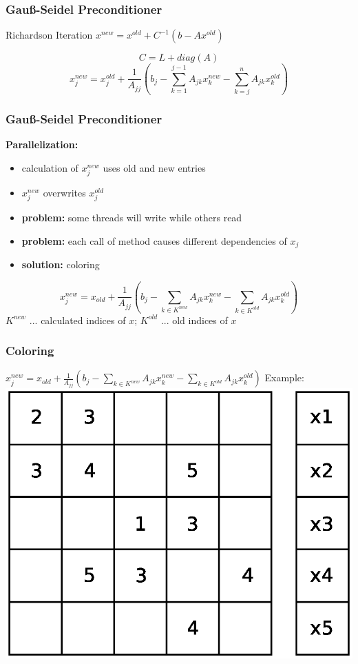 \documentclass{beamer}
\begin{document}
\begin{frame}
\frametitle{Gau\ss-Seidel Preconditioner}
\begin{block}{Richardson Iteration}
$x^{new} = x^{old} + C^{-1} (b - Ax^{old})$
\end{block}
$$C = L + diag(A)$$
$$x_j^{new} = x_j^{old} + \frac{1}{A_{jj}} \left(b_{j} - \sum_{k=1}^{j-1} A_{jk}
x_k^{new} - \sum_{k=j}^{n} A_{jk} x_k^{old}\right)$$

\end{frame}

\begin{frame}
\frametitle{Gau\ss-Seidel Preconditioner}

\textbf{Parallelization:}
\begin{itemize}
\item calculation of $x_j^{new}$ uses old and new entries
\item $x_j^{new}$ overwrites $x_j^{old}$
\item \textbf{problem:} some threads will write while others read
\item \textbf{problem:} each call of method causes different dependencies of $x_j$ 
\item \textbf{solution:}
coloring
\end{itemize}


$$ x_j^{new} = x_{old} + \frac{1}{A_{jj}} \left(b_{j} - \sum_{k \in K^{new}}A_{jk}
 x_k^{new} - \sum_{k \in K^{old}}A_{jk} x_k^{old}\right)$$
$K^{new}$ ... calculated indices of $x$;
$K^{old}$ ... old indices of $x$
\end{frame}

\begin{frame}
\frametitle{Coloring}
$ x_j^{new} = x_{old} + \frac{1}{A_{jj}} \left(b_{j} - \sum_{k \in K^{new}}A_{jk}
 x_k^{new} - \sum_{k \in K^{old}}A_{jk} x_k^{old}\right)$
Example:
\includegraphics[width=0.8\linewidth]{graphic/coloringGS1.eps}
\end{frame}
\end{document}
